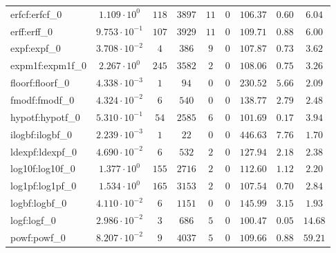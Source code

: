 \begin{tabular}{|l|c|c|c|c|c|c|c|c|}
erfcf:erfcf\_0               & $ 1.109 \cdot 10^{0}  $ & $ 118    $ & $ 3897   $ & $ 11  $ & $ 0   $ & $ 106.37      $ & $ 0.60    $ & $ 6.04    $ \\
erff:erff\_0                 & $ 9.753 \cdot 10^{-1} $ & $ 107    $ & $ 3929   $ & $ 11  $ & $ 0   $ & $ 109.71      $ & $ 0.88    $ & $ 6.00    $ \\
expf:expf\_0                 & $ 3.708 \cdot 10^{-2} $ & $ 4      $ & $ 386    $ & $ 9   $ & $ 0   $ & $ 107.87      $ & $ 0.73    $ & $ 3.62    $ \\
expm1f:expm1f\_0             & $ 2.267 \cdot 10^{0}  $ & $ 245    $ & $ 3582   $ & $ 2   $ & $ 0   $ & $ 108.06      $ & $ 0.75    $ & $ 3.26    $ \\
floorf:floorf\_0             & $ 4.338 \cdot 10^{-3} $ & $ 1      $ & $ 94     $ & $ 0   $ & $ 0   $ & $ 230.52      $ & $ 5.66    $ & $ 2.09    $ \\
fmodf:fmodf\_0               & $ 4.324 \cdot 10^{-2} $ & $ 6      $ & $ 540    $ & $ 0   $ & $ 0   $ & $ 138.77      $ & $ 2.79    $ & $ 2.48    $ \\
hypotf:hypotf\_0             & $ 5.310 \cdot 10^{-1} $ & $ 54     $ & $ 2585   $ & $ 6   $ & $ 0   $ & $ 101.69      $ & $ 0.17    $ & $ 3.94    $ \\
ilogbf:ilogbf\_0             & $ 2.239 \cdot 10^{-3} $ & $ 1      $ & $ 22     $ & $ 0   $ & $ 0   $ & $ 446.63      $ & $ 7.76    $ & $ 1.70    $ \\
ldexpf:ldexpf\_0             & $ 4.690 \cdot 10^{-2} $ & $ 6      $ & $ 532    $ & $ 2   $ & $ 0   $ & $ 127.94      $ & $ 2.18    $ & $ 2.38    $ \\
log10f:log10f\_0             & $ 1.377 \cdot 10^{0}  $ & $ 155    $ & $ 2716   $ & $ 2   $ & $ 0   $ & $ 112.60      $ & $ 1.12    $ & $ 2.20    $ \\
log1pf:log1pf\_0             & $ 1.534 \cdot 10^{0}  $ & $ 165    $ & $ 3153   $ & $ 2   $ & $ 0   $ & $ 107.54      $ & $ 0.70    $ & $ 2.84    $ \\
logbf:logbf\_0               & $ 4.110 \cdot 10^{-2} $ & $ 6      $ & $ 1151   $ & $ 0   $ & $ 0   $ & $ 145.99      $ & $ 3.15    $ & $ 1.93    $ \\
logf:logf\_0                 & $ 2.986 \cdot 10^{-2} $ & $ 3      $ & $ 686    $ & $ 5   $ & $ 0   $ & $ 100.47      $ & $ 0.05    $ & $ 14.68   $ \\
powf:powf\_0                 & $ 8.207 \cdot 10^{-2} $ & $ 9      $ & $ 4037   $ & $ 5   $ & $ 0   $ & $ 109.66      $ & $ 0.88    $ & $ 59.21   $ \\

\end{tabular}
